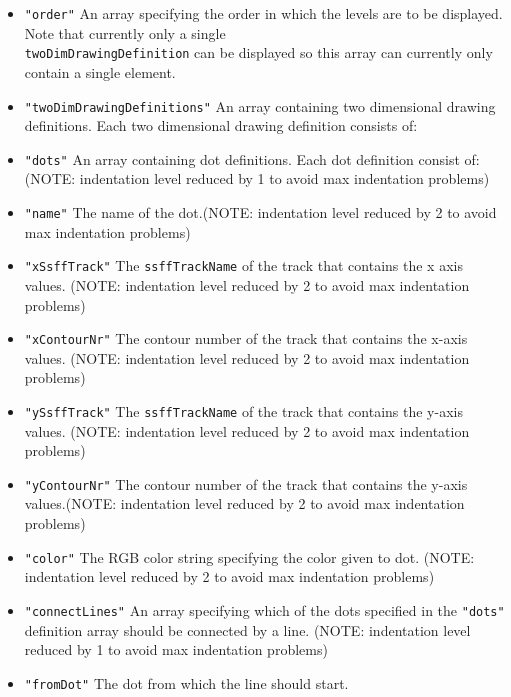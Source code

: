 \documentclass[]{book}
\theoremstyle{definition}
\theoremstyle{definition}
\theoremstyle{definition}
\theoremstyle{remark}
\begin{document}
\begin{itemize}
\begin{itemize}
\begin{itemize}
      \begin{itemize}
      \item
        \texttt{"order"} An array specifying the order in which the
        levels are to be displayed. Note that currently only a single\\
        \texttt{twoDimDrawingDefinition} can be displayed so this array
        can currently only contain a single element.
      \item
        \texttt{"twoDimDrawingDefinitions"} An array containing two
        dimensional drawing definitions. Each two dimensional drawing
        definition consists of:
      \item
        \texttt{"dots"} An array containing dot definitions. Each dot
        definition consist of: (NOTE: indentation level reduced by 1 to
        avoid max indentation problems)
      \item
        \texttt{"name"} The name of the dot.(NOTE: indentation level
        reduced by 2 to avoid max indentation problems)
      \item
        \texttt{"xSsffTrack"} The \texttt{ssffTrackName} of the track
        that contains the x axis values. (NOTE: indentation level
        reduced by 2 to avoid max indentation problems)
      \item
        \texttt{"xContourNr"} The contour number of the track that
        contains the x-axis values. (NOTE: indentation level reduced by
        2 to avoid max indentation problems)
      \item
        \texttt{"ySsffTrack"} The \texttt{ssffTrackName} of the track
        that contains the y-axis values. (NOTE: indentation level
        reduced by 2 to avoid max indentation problems)
      \item
        \texttt{"yContourNr"} The contour number of the track that
        contains the y-axis values.(NOTE: indentation level reduced by 2
        to avoid max indentation problems)
      \item
        \texttt{"color"} The RGB color string specifying the color given
        to dot. (NOTE: indentation level reduced by 2 to avoid max
        indentation problems)
      \item
        \texttt{"connectLines"} An array specifying which of the dots
        specified in the \texttt{"dots"} definition array should be
        connected by a line. (NOTE: indentation level reduced by 1 to
        avoid max indentation problems)
      \item
        \texttt{"fromDot"} The dot from which the line should start.

\end{itemize}
\end{itemize}
\end{itemize}
\end{itemize}
\end{document}
